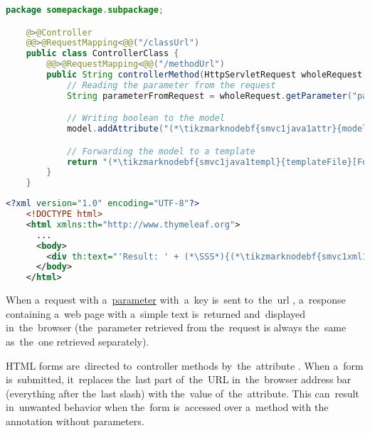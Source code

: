 \begin{lstlisting}[language=Java, title={Controller class}]
    package somepackage.subpackage;

    @>@Controller
    @@>@RequestMapping<@@("/classUrl")
    public class ControllerClass {
        @@>@RequestMapping<@@("/methodUrl")
        public String controllerMethod(HttpServletRequest wholeRequest, @@>@RequestParam<@@("paramKey") String singleParameter, Model model) {
            // Reading the parameter from the request
            String parameterFromRequest = wholeRequest.getParameter("paramKey");

            // Writing boolean to the model
            model.addAttribute("(*\tikzmarknodebf{smvc1java1attr}{modelAttribute}[ForestGreen]*)", parameterFromRequest.equals(singleParameter));

            // Forwarding the model to a template
            return "(*\tikzmarknodebf{smvc1java1templ}{templateFile}[ForestGreen]*)";
        }
    }
\end{lstlisting}
\begin{lstlisting}[language=XML, title={Thymeleaf template file called \tikzmarknodebf{smvc1xml1templ}{\textit{templateFile}}\textit{.html}}]
    <?xml version="1.0" encoding="UTF-8"?>
    <!DOCTYPE html>
    <html xmlns:th="http://www.thymeleaf.org">
      ...
      <body>
        <div th:text="'Result: ' + (*\SSS*){(*\tikzmarknodebf{smvc1xml1attr}{modelAttribute}[ForestGreen]*)}"></div>
      </body>
    </html>
\end{lstlisting}

\noindent When a~request with a~\hyperref[jspattributeparameter]{parameter} with~a~key  is~sent to~the~url , a~response containing a~web page with a~simple text  is~returned and~displayed in~the~browser (the~parameter retrieved from the~request is always the~same as~the~one retrieved separately).

\warning HTML forms are~directed to~controller methods by~the~attribute .
When a~form is~submitted, it~replaces the~last part of~the~URL in~the~browser address bar (everything after the~last slash) with the~value of~the~attribute.
This can~result in~unwanted behavior when the~form is~accessed over a~method with the~ annotation without parameters.
\newpage

